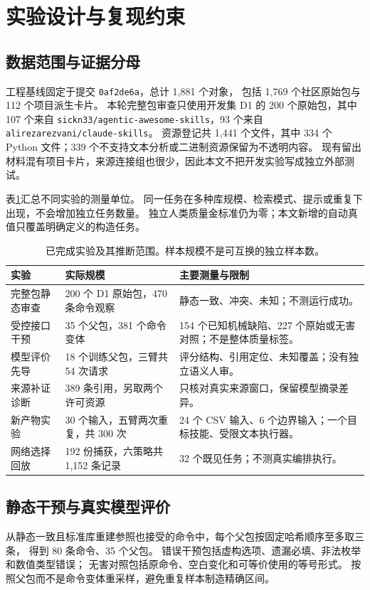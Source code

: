 \section{实验设计与复现约束}
\subsection{数据范围与证据分母}
工程基线固定于提交 \texttt{0af2de6a}，总计 1,881 个对象，
包括 1,769 个社区原始包与 112 个项目派生卡片。
本轮完整包审查只使用开发集 D1 的 200 个原始包，其中 107 个来自
\texttt{sickn33/agentic-awesome-skills}，93 个来自 \texttt{alirezarezvani/claude-skills}。
资源登记共 1,441 个文件，其中 334 个 Python 文件；339 个不支持文本分析或二进制资源保留为不透明内容。
现有留出材料混有项目卡片，来源连接组也很少，因此本文不把开发实验写成独立外部测试。

表\ref{tab:inventory}汇总不同实验的测量单位。
同一任务在多种库规模、检索模式、提示或重复下出现，不会增加独立任务数量。
独立人类质量金标准仍为零；本文新增的自动真值只覆盖明确定义的构造任务。

\begin{table}[t]
\caption{已完成实验及其推断范围。样本规模不是可互换的独立样本数。}
\label{tab:inventory}\centering\small
\begin{tabularx}{\textwidth}{p{}p{}X}
\toprule
实验 & 实际规模 & 主要测量与限制 \\
\midrule
完整包静态审查 & 200 个 D1 原始包，470 条命令观察 & 静态一致、冲突、未知；不测运行成功。\\
受控接口干预 & 35 个父包，381 个命令变体 & 154 个已知机械缺陷、227 个原始或无害对照；不是整体质量标签。\\
模型评价先导 & 18 个训练父包，三臂共 54 次请求 & 评分结构、引用定位、未知覆盖；没有独立语义人审。\\
来源补证诊断 & 389 条引用，另取两个许可资源 & 只核对真实来源窗口，保留模型摘录差异。\\
新产物实验 & 30 个输入，五臂两次重复，共 300 次 & 24 个 CSV 输入、6 个边界输入；一个目标技能、受限文本执行器。\\
网络选择回放 & 192 份捕获，六策略共 1,152 条记录 & 32 个既见任务；不测真实编排执行。\\
\bottomrule
\end{tabularx}
\end{table}

\subsection{静态干预与真实模型评价}
从静态一致且标准库重建参照也接受的命令中，每个父包按固定哈希顺序至多取三条，
得到 80 条命令、35 个父包。
错误干预包括虚构选项、遗漏必填、非法枚举和数值类型错误；
无害对照包括原命令、空白变化和可等价使用的等号形式。
按照父包而不是命令变体重采样，避免重复样本制造精确区间。

